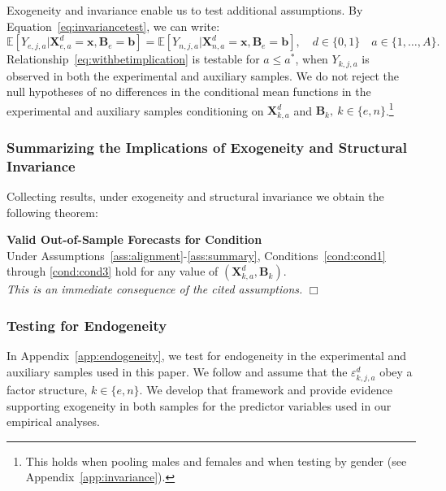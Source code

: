Exogeneity and invariance enable us to test additional assumptions. By Equation~\eqref{eq:invariancetest}, we can write:
\begin{equation}\label{eq:withbetimplication}
\mathbb{E} \left[ Y_{e,j,a} | \bm{X}^d_{e,a} = \bm{x}, \bm{B}_e = \bm{b} \right] = \mathbb{E} \left[ Y_{n,j,a} | \bm{X}^d_{n,a} = \bm{x}, \bm{B}_e = \bm{b} \right], \quad d \in \{0,1\} \quad  a \in \{1,\dots,A\}.
\end{equation}
Relationship~\eqref{eq:withbetimplication} is testable for $a \leq a^*$, when $Y_{k,j,a}$ is observed in both the experimental and auxiliary samples. We do not reject the null hypotheses of no differences in the conditional mean functions in the experimental and auxiliary samples conditioning on $\bm{X}_{k,a}^d$ and $\bm{B}_k, \: k \in \{e,n\}$.\footnote{This holds when pooling males and females and when testing by gender (see Appendix~\ref{app:invariance}).}


\subsubsection{Summarizing the Implications of Exogeneity and Structural Invariance}

Collecting results, under exogeneity and structural invariance we obtain the following theorem:

\onehalfspacing
\setcounter{theorem}{0}
\begin{theorem}\label{theorem:main} \textbf{Valid Out-of-Sample Forecasts for Condition} \\
Under Assumptions~\ref{ass:alignment}-\ref{ass:summary}, Conditions~\ref{cond:cond1} through \ref{cond:cond3} hold for any value of $\left( \bm{X}^d_{k,a}, \bm{B}_k \right)$. \\
\emph{This is an immediate consequence of the cited assumptions.} $\Box$
\end{theorem}
\doublespacing

\subsubsection{Testing for Endogeneity}\label{section:accendog}

In Appendix~\ref{app:endogeneity}, we test for endogeneity in the experimental and auxiliary samples used in this paper. We follow \citet{Heckman_Pinto_etal_2013_PerryFactor} and assume that the $\varepsilon_{k,j,a}^d$ obey a factor structure, $k \in \{e,n\}$. We develop that framework and provide evidence supporting exogeneity in both samples for the predictor variables used in our empirical analyses.

